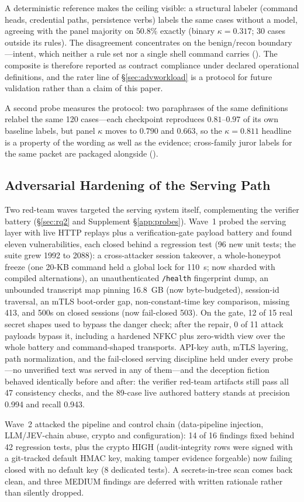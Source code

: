 A deterministic reference makes the ceiling visible: a structural
labeler (command heads, credential paths, persistence verbs) labels the
same cases without a model, agreeing with the panel majority on $50.8\%$
exactly (binary $\kappa=0.317$; 30 cases outside its rules). The
disagreement concentrates on the benign/recon boundary---intent, which
neither a rule set nor a single shell command carries
(). The composite
is therefore reported as contract compliance under declared operational
definitions, and the rater line of \S\ref{sec:advworkload} is a protocol
for future validation rather than a claim of this paper.

A second probe measures the protocol: two paraphrases of the same
definitions relabel the same 120 cases---each checkpoint reproduces
$0.81$--$0.97$ of its own baseline labels, but panel $\kappa$ moves to
$0.790$ and $0.663$, so the $\kappa=0.811$ headline is a property of the
wording as well as the evidence; cross-family juror labels for the same
packet are packaged alongside ().

\subsection{Adversarial Hardening of the Serving Path}
\label{sec:hardening}
Two red-team waves targeted the serving system itself, complementing
the verifier battery (\S\ref{sec:rq2} and Supplement
\S\ref{app:probes}). Wave~1 probed the serving layer with live HTTP replays plus a
verification-gate payload battery and found eleven vulnerabilities, each
closed behind a regression test (96 new unit tests; the suite grew 1992
to 2088): a cross-attacker session takeover, a whole-honeypot freeze (one
20-KB command held a global lock for 110~s; now sharded with compiled
alternations), an unauthenticated \texttt{/health} fingerprint dump, an
unbounded transcript map pinning 16.8~GB (now byte-budgeted), session-id
traversal, an mTLS boot-order gap, non-constant-time key comparison,
missing 413, and 500s on closed sessions (now fail-closed 503). On the gate, 12 of 15 real secret
shapes used to bypass the danger check; after the repair, 0 of 11
attack payloads bypass it, including a hardened NFKC plus zero-width
view over the whole battery and command-shaped transports. API-key
auth, mTLS layering, path normalization, and the fail-closed serving
discipline held under every probe---no unverified text was served in
any of them---and the deception fiction behaved identically before
and after: the verifier red-team artifacts still pass all 47
consistency checks, and the 89-case live authored battery stands at
precision 0.994 and recall 0.943.

Wave~2 attacked the pipeline and control chain (data-pipeline
injection, LLM/JEV-chain abuse, crypto and configuration): 14 of 16
findings fixed behind 42 regression tests, plus the crypto HIGH
(audit-integrity rows were signed with a git-tracked default HMAC key,
making tamper evidence forgeable) now failing closed with no default
key (8 dedicated tests). A secrets-in-tree scan comes back clean, and
three MEDIUM findings are deferred with written rationale rather than
silently dropped.
